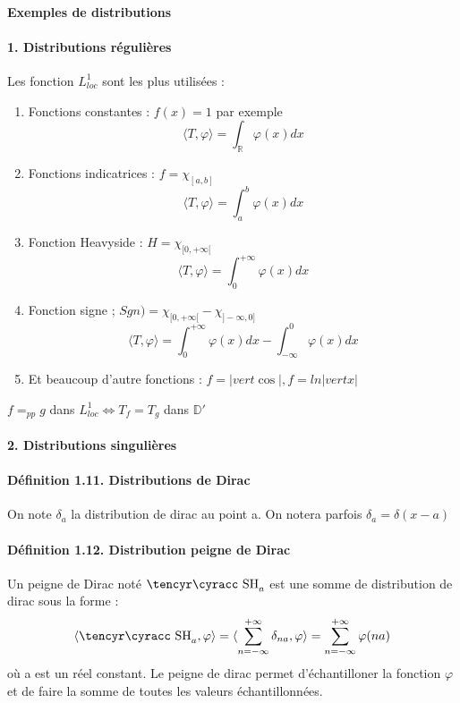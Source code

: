 \documentclass[12pt,a4paper]{report}
\newcommand{\ens}[1]{\mathbb{#1}}
\def\cyr{\tencyr\cyracc}
\def\dc{\mbox{\cyr SH}}
\begin{document}
\paragraph{Exemples de distributions}
\paragraph{1. Distributions régulières}
Les fonction \(L^1_{loc}\) sont les plus utilisées :
\begin{enumerate}
	\item Fonctions constantes : \(f(x) =1 \) par exemple
	\[
		\langle T, \varphi \rangle = \int_{\ens{R}} \varphi(x) dx
	\]
	\item Fonctions indicatrices : \(f = \chi_{[a,b]}\)
	\[
		\langle T, \varphi \rangle = \int_{a}^b \varphi(x) dx
	\]
	\item Fonction Heavyside : \(H = \chi_{[0,+\infty[}\)
	\[
		\langle T, \varphi \rangle = \int_{0}^{+\infty} \varphi(x) dx
	\]
	\item Fonction signe ; \(Sgn ) = \chi_{[0,+\infty[} - \chi_{]-\infty, 0]} \)
	\[
		\langle T, \varphi \rangle = \int_{0}^{+\infty} \varphi(x) dx - \int_{-\infty}^0 \varphi(x) dx
	\]
	\item Et beaucoup d'autre fonctions : \(f = |vert \cos \vert, f = ln |vert x \vert\)
\end{enumerate}

\(f =_{pp} g\) dans \(L^1_{loc} \Leftrightarrow T_f = T_g\) dans \(\ens{D}'\)

\paragraph{2. Distributions singulières}

\paragraph{Définition 1.11. Distributions de Dirac}
On note \(\delta_a\) la distribution de dirac au point a. On notera parfois \(\delta_a = \delta(x-a)\)

\paragraph{Définition 1.12. Distribution peigne de Dirac}
	Un peigne de Dirac noté \(\dc_a\) est une somme de distribution de dirac sous la forme :
	\[
		\langle \dc_a, \varphi \rangle = \langle \sum_{n = -\infty}^{+\infty} \delta_{na}, \varphi \rangle = \sum_{n = -\infty}^{+\infty} \varphi(na)
	\]
	où a est un réel constant. Le peigne de dirac permet d'échantilloner la fonction \(\varphi\) et de faire la somme de toutes les valeurs échantillonnées.
	
\end{document}

